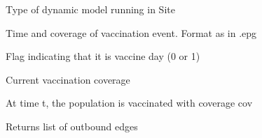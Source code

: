 \documentclass[a4paper,10pt,english]{sphinxmanual}
\begin{document}
\begin{fulllineitems}
\begin{fulllineitems}
\end{fulllineitems}


\begin{fulllineitems}
\label{scripting:Site.modtype}
Type of dynamic model running in Site

\end{fulllineitems}


\begin{fulllineitems}
\label{scripting:Site.vaccination}
Time and coverage of vaccination event. Format as in .epg

\end{fulllineitems}


\begin{fulllineitems}
\label{scripting:Site.vaccineNow}
Flag indicating that it is vaccine day (0 or 1)

\end{fulllineitems}


\begin{fulllineitems}
\label{scripting:Site.vaccov}
Current vaccination coverage

\end{fulllineitems}


\begin{fulllineitems}
\label{scripting:Site.vaccinate}
At time t, the population is vaccinated with coverage cov

\end{fulllineitems}


\begin{fulllineitems}
\label{scripting:Site.getOutEdges}
Returns list of outbound edges

\end{fulllineitems}



\end{fulllineitems}
\end{document}
